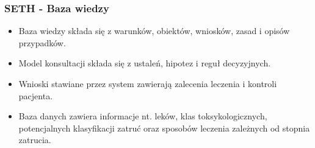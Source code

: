 \begin{frame}
\frametitle{SETH - Baza wiedzy}

\begin{itemize}
    \item Baza wiedzy składa się z warunków, obiektów, wniosków, zasad i opisów
    przypadków.
    \item Model konsultacji składa się z ustaleń, hipotez i reguł decyzyjnych.
    \item Wnioski stawiane przez system zawierają zalecenia leczenia i kontroli
    pacjenta.
    \item Baza danych zawiera informacje nt. leków, klas toksykologicznych,
    potencjalnych klasyfikacji zatruć oraz sposobów leczenia zależnych od
    stopnia zatrucia.
\end{itemize}


\end{frame}

